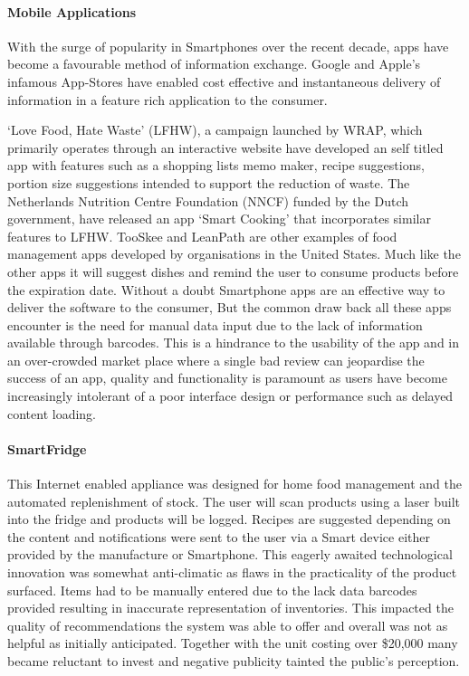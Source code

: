 \documentclass[a4paper, 11pt]{article}
\begin{document}
\paragraph{Mobile Applications}
With the surge of popularity in Smartphones over the recent decade, apps have become a favourable method of information exchange. Google and Apple's infamous App-Stores have enabled cost effective and instantaneous delivery of information in a feature rich application to the consumer.

`Love Food, Hate Waste' (LFHW), a campaign launched by WRAP, which primarily operates through an interactive website have developed an self titled app with features such as a shopping lists memo maker, recipe suggestions, portion size suggestions intended to support the reduction of waste. The Netherlands Nutrition Centre Foundation (NNCF) funded by the Dutch government, have released an app `Smart Cooking' that incorporates similar features to LFHW. TooSkee and LeanPath\cite{FoodWaste} are other examples of food management apps developed by organisations in the United States. Much like the other apps it will suggest dishes and remind the user to consume products before the expiration date. Without a doubt Smartphone apps are an effective way to deliver the software to the consumer, But the common draw back all these apps encounter is the need for manual data input due to the lack of information available through barcodes. This is a hindrance to the usability of the app and in an over-crowded market place where a single bad review can jeopardise the success of an app, quality and functionality is paramount as users have become increasingly intolerant of a poor interface design or performance such as delayed content loading.

\paragraph{SmartFridge}
This Internet enabled appliance was designed for home food management and the automated replenishment of stock. The user will scan products using a laser built into the fridge and products will be logged. Recipes are suggested depending on the content and notifications were sent to the user via a Smart device either provided by the manufacture or Smartphone. This eagerly awaited technological innovation was somewhat anti-climatic as flaws in the practicality of the product surfaced. Items had to be manually entered due to the lack data barcodes provided resulting in inaccurate representation of inventories. This impacted the quality of recommendations the system was able to offer and overall was not as helpful as initially anticipated. Together with the unit costing over \$20,000 many became reluctant to invest and negative publicity tainted the public's perception.\cite{idiotFridge}
\end{document}
